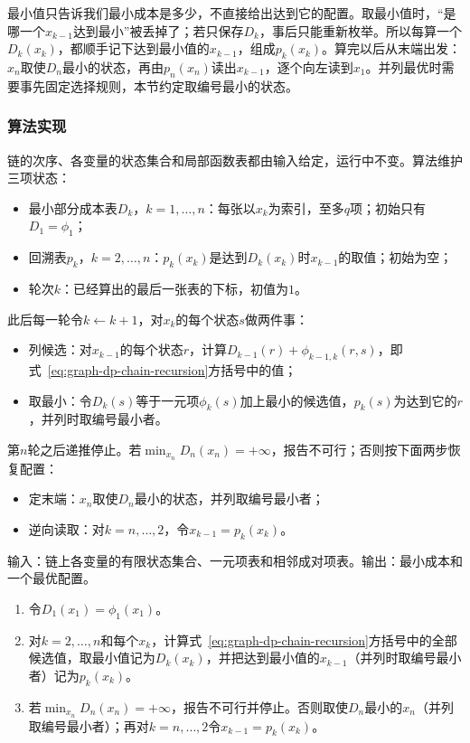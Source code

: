 最小值只告诉我们最小成本是多少，不直接给出达到它的配置。取最小值时，“是哪一个$x_{k-1}$达到最小”被丢掉了；若只保存$D_k$，事后只能重新枚举。所以每算一个$D_k(x_k)$，都顺手记下达到最小值的$x_{k-1}$，组成$p_k(x_k)$。算完以后从末端出发：$x_n$取使$D_n$最小的状态，再由$p_n(x_n)$读出$x_{k-1}$，逐个向左读到$x_1$。并列最优时需要事先固定选择规则，本节约定取编号最小的状态。

\subsubsection{算法实现}

链的次序、各变量的状态集合和局部函数表都由输入给定，运行中不变。算法维护三项状态：
\begin{itemize}
  \item 最小部分成本表$D_k$，$k=1,\ldots,n$：每张以$x_k$为索引，至多$q$项；初始只有$D_1=\phi_1$；
  \item 回溯表$p_k$，$k=2,\ldots,n$：$p_k(x_k)$是达到$D_k(x_k)$时$x_{k-1}$的取值；初始为空；
  \item 轮次$k$：已经算出的最后一张表的下标，初值为$1$。
\end{itemize}
此后每一轮令$k\gets k+1$，对$x_k$的每个状态$s$做两件事：
\begin{itemize}
  \item 列候选：对$x_{k-1}$的每个状态$r$，计算$D_{k-1}(r)+\phi_{k-1,k}(r,s)$，即式~\eqref{eq:graph-dp-chain-recursion}方括号中的值；
  \item 取最小：令$D_k(s)$等于一元项$\phi_k(s)$加上最小的候选值，$p_k(s)$为达到它的$r$，并列时取编号最小者。
\end{itemize}
第$n$轮之后递推停止。若$\min_{x_n}D_n(x_n)=+\infty$，报告不可行；否则按下面两步恢复配置：
\begin{itemize}
  \item 定末端：$x_n$取使$D_n$最小的状态，并列取编号最小者；
  \item 逆向读取：对$k=n,\ldots,2$，令$x_{k-1}=p_k(x_k)$。
\end{itemize}

\begin{algorithm}[链上的最小成本递推]
\label{alg:graph-dp-chain}
输入：链上各变量的有限状态集合、一元项表和相邻成对项表。输出：最小成本和一个最优配置。
\begin{enumerate}
  \item 令$D_1(x_1)=\phi_1(x_1)$。
  \item 对$k=2,\ldots,n$和每个$x_k$，计算式~\eqref{eq:graph-dp-chain-recursion}方括号中的全部候选值，取最小值记为$D_k(x_k)$，并把达到最小值的$x_{k-1}$（并列时取编号最小者）记为$p_k(x_k)$。
  \item 若$\min_{x_n}D_n(x_n)=+\infty$，报告不可行并停止。否则取使$D_n$最小的$x_n$（并列取编号最小者）；再对$k=n,\ldots,2$令$x_{k-1}=p_k(x_k)$。
\end{enumerate}
\end{algorithm}

